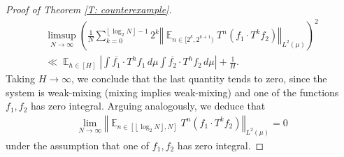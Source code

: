 \documentclass[11pt]{amsart}
\newtheorem{lemma}{Lemma}[section]
\theoremstyle{definition}
\DeclareMathOperator*{\E}{\mathbb{E}}
\newcommand{\norm}[1]{\left\Vert #1\right\Vert}
\newcommand{\1}{{\mathbf{1}}}
\newcommand{\brac}[1]{\mathopen{}\left( #1 \mathclose{}\right)}
\newcommand{\floor}[1]{{\left \lfloor #1 \right \rfloor}}
\begin{document}
\begin{proof}[Proof of Theorem \ref{T: counterexample}]
\begin{multline*}
    \limsup_{N\to\infty}\brac{\frac{1}{N}\sum_{k=0}^{\floor{\log_2 N}-1}2^k \norm{\E_{n\in[2^k,2^{k+1})} T^n(f_1\cdot T^{k}f_2)}_{L^2(\mu)}}^2\\
    \ll     \E_{h\in[H]}\left|\int \overline{f_1}\cdot T^h f_1\, d\mu \int \overline{f_2}\cdot T^h f_2\, d\mu\right|+\frac{1}{H}.
    \end{multline*}
    Taking $H\to\infty$, we conclude that the last quantity tends to zero, since the system is weak-mixing (mixing implies weak-mixing) and one of the functions $f_1,f_2$ has zero integral. Arguing analogously, we deduce that
    \begin{align*}
        \lim_{N\to\infty}\norm{\E_{n\in[\floor{\log_2 N}, N]}T^n(f_1\cdot T^{k}f_2)}_{L^2(\mu)} = 0
    \end{align*}
    under the assumption that one of $f_1,f_2$ has zero integral.
    \end{proof}





\end{document}
